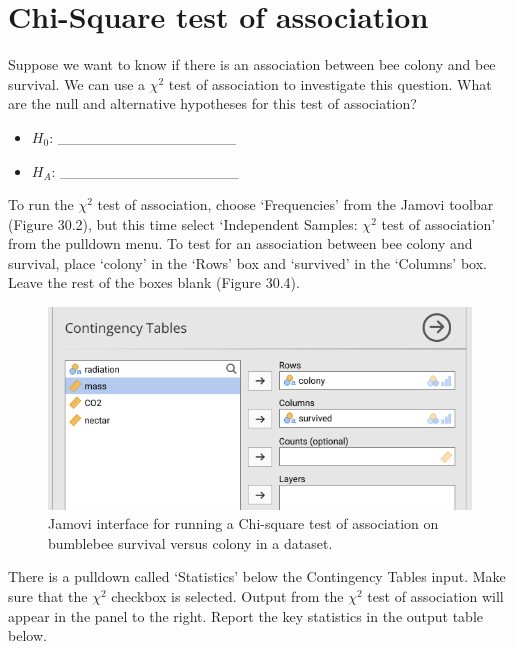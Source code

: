 \documentclass[
]{scrbook}
\begin{document}
\hypertarget{chi-square-test-of-association}{%
\section{Chi-Square test of association}\label{chi-square-test-of-association}}

Suppose we want to know if there is an association between bee colony and bee survival.
We can use a \(\chi^{2}\) test of association to investigate this question.
What are the null and alternative hypotheses for this test of association?

\begin{itemize}
\item
  \(H_{0}\): \_\_\_\_\_\_\_\_\_\_\_\_\_\_\_\_\_
\item
  \(H_{A}\): \_\_\_\_\_\_\_\_\_\_\_\_\_\_\_\_\_
\end{itemize}

To run the \(\chi^{2}\) test of association, choose `Frequencies' from the Jamovi toolbar (Figure 30.2), but this time select `Independent Samples: \(\chi^{2}\) test of association' from the pulldown menu.
To test for an association between bee colony and survival, place `colony' in the `Rows' box and `survived' in the `Columns' box.
Leave the rest of the boxes blank (Figure 30.4).

\begin{figure}
\includegraphics[width=1\linewidth]{img/jamovi_test_of_association_interface} \caption{Jamovi interface for running a Chi-square test of association on bumblebee survival versus colony in a dataset.}\label{fig:unnamed-chunk-153}
\end{figure}

There is a pulldown called `Statistics' below the Contingency Tables input.
Make sure that the \(\chi^{2}\) checkbox is selected.
Output from the \(\chi^{2}\) test of association will appear in the panel to the right.
Report the key statistics in the output table below.
\end{document}
